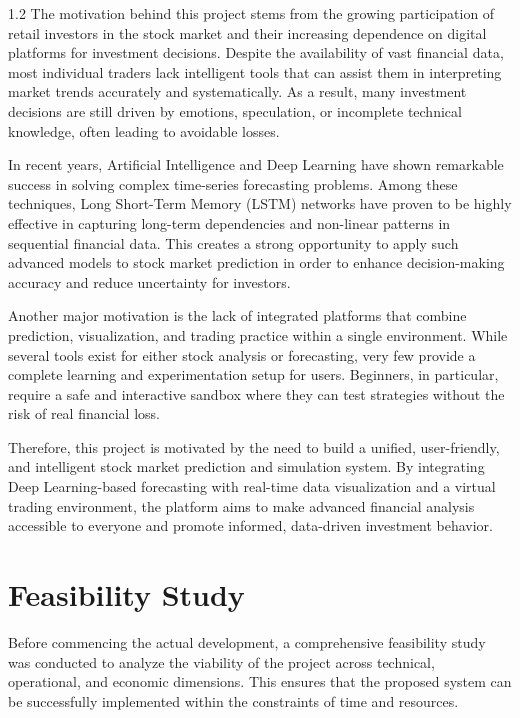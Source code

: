 \documentclass[12pt, a4paper]{report}
\begin{document}
\begin{spacing}{1.2}
The motivation behind this project stems from the growing participation of retail investors in the stock market and their increasing dependence on digital platforms for investment decisions. Despite the availability of vast financial data, most individual traders lack intelligent tools that can assist them in interpreting market trends accurately and systematically. As a result, many investment decisions are still driven by emotions, speculation, or incomplete technical knowledge, often leading to avoidable losses.

In recent years, Artificial Intelligence and Deep Learning have shown remarkable success in solving complex time-series forecasting problems. Among these techniques, Long Short-Term Memory (LSTM) networks have proven to be highly effective in capturing long-term dependencies and non-linear patterns in sequential financial data. This creates a strong opportunity to apply such advanced models to stock market prediction in order to enhance decision-making accuracy and reduce uncertainty for investors.

Another major motivation is the lack of integrated platforms that combine prediction, visualization, and trading practice within a single environment. While several tools exist for either stock analysis or forecasting, very few provide a complete learning and experimentation setup for users. Beginners, in particular, require a safe and interactive sandbox where they can test strategies without the risk of real financial loss.

Therefore, this project is motivated by the need to build a unified, user-friendly, and intelligent stock market prediction and simulation system. By integrating Deep Learning-based forecasting with real-time data visualization and a virtual trading environment, the platform aims to make advanced financial analysis accessible to everyone and promote informed, data-driven investment behavior.


\section{Feasibility Study} Before commencing the actual development, a comprehensive feasibility study was conducted to analyze the viability of the project across technical, operational, and economic dimensions. This ensures that the proposed system can be successfully implemented within the constraints of time and resources.


\end{spacing}
\end{document}
